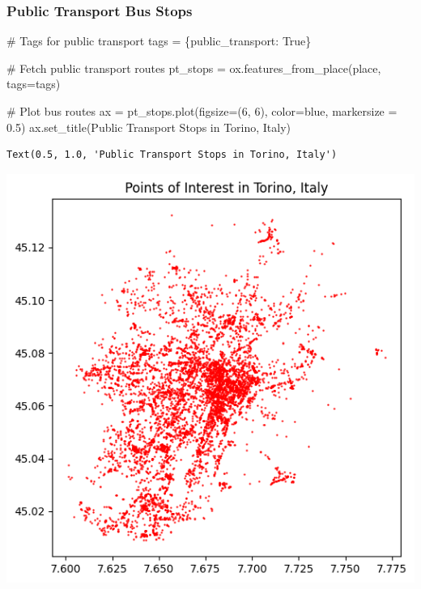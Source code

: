 \documentclass[
  letterpaper,
  DIV=11,
  numbers=noendperiod]{scrreprt}
\newenvironment{Shaded}{\begin{snugshade}}{\end{snugshade}}
\newcommand{\CommentTok}[1]{\textcolor[rgb]{0.37,0.37,0.37}{#1}}
\newcommand{\DecValTok}[1]{\textcolor[rgb]{0.68,0.00,0.00}{#1}}
\newcommand{\FloatTok}[1]{\textcolor[rgb]{0.68,0.00,0.00}{#1}}
\newcommand{\NormalTok}[1]{\textcolor[rgb]{0.00,0.23,0.31}{#1}}
\newcommand{\OperatorTok}[1]{\textcolor[rgb]{0.37,0.37,0.37}{#1}}
\newcommand{\StringTok}[1]{\textcolor[rgb]{0.13,0.47,0.30}{#1}}
\newcommand{\VariableTok}[1]{\textcolor[rgb]{0.07,0.07,0.07}{#1}}
\begin{document}
\subsubsection{Public Transport Bus
Stops}\label{public-transport-bus-stops}

\begin{Shaded}
\begin{Highlighting}[]
\CommentTok{\# Tags for public transport}
\NormalTok{tags }\OperatorTok{=}\NormalTok{ \{}\StringTok{\textquotesingle{}public\_transport\textquotesingle{}}\NormalTok{: }\VariableTok{True}\NormalTok{\}}

\CommentTok{\# Fetch public transport routes}
\NormalTok{pt\_stops }\OperatorTok{=}\NormalTok{ ox.features\_from\_place(place, tags}\OperatorTok{=}\NormalTok{tags)}

\CommentTok{\# Plot bus routes}
\NormalTok{ax }\OperatorTok{=}\NormalTok{ pt\_stops.plot(figsize}\OperatorTok{=}\NormalTok{(}\DecValTok{6}\NormalTok{, }\DecValTok{6}\NormalTok{), color}\OperatorTok{=}\StringTok{\textquotesingle{}blue\textquotesingle{}}\NormalTok{, markersize }\OperatorTok{=} \FloatTok{0.5}\NormalTok{)}
\NormalTok{ax.set\_title(}\StringTok{\textquotesingle{}Public Transport Stops in Torino, Italy\textquotesingle{}}\NormalTok{)}
\end{Highlighting}
\end{Shaded}

\begin{verbatim}
Text(0.5, 1.0, 'Public Transport Stops in Torino, Italy')
\end{verbatim}

\includegraphics{labs/w07_OSM_files/figure-pdf/cell-45-output-2.png}
\end{document}
